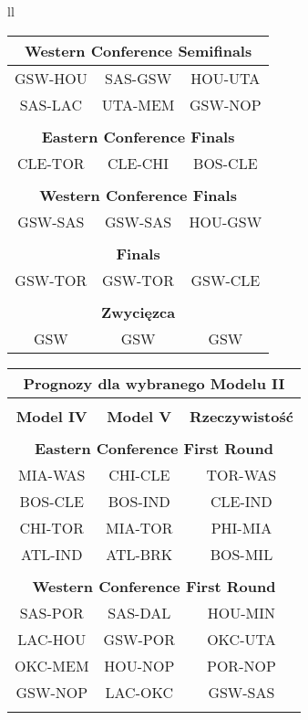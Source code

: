 \documentclass[inzynierska]{pwr_wmat_praca_dyplomowa}
\theoremstyle{plain}
\numberwithin{theorem}{chapter}
\theoremstyle{definition}
\numberwithin{theorem}{chapter}
\begin{document}
\begin{table}[]
\begin{tabular}{ll}
\begin{tabular}{|c|c|c|}
	\multicolumn{3}{|c|}{\textbf{Western Conference Semifinals}} \\\hline
	GSW-HOU&SAS-GSW &HOU-UTA\\\hline
	SAS-LAC&UTA-MEM &GSW-NOP\\\hline
	\multicolumn{3}{|c|}{} \\\hline
	
	\multicolumn{3}{|c|}{\textbf{Eastern Conference Finals}} \\\hline
	CLE-TOR&CLE-CHI &BOS-CLE\\\hline
	\multicolumn{3}{|c|}{} \\\hline
	
	\multicolumn{3}{|c|}{\textbf{Western Conference Finals}} \\\hline
	GSW-SAS&GSW-SAS &HOU-GSW\\\hline
	\multicolumn{3}{|c|}{} \\\hline
	
	\multicolumn{3}{|c|}{\textbf{Finals}} \\\hline
	GSW-TOR& GSW-TOR &GSW-CLE\\\hline
	\multicolumn{3}{|c|}{} \\\hline
	
	\multicolumn{3}{|c|}{\textbf{Zwycięzca}} \\\hline
	GSW&  GSW&GSW\\\hline
	\end{tabular}

	\begin{tabular}{ |c|c|c|  }
		\hline
		\multicolumn{3}{|c|}{\textbf{Prognozy dla wybranego Modelu II}} \\\hline
		\multicolumn{3}{|c|}{} \\\hline	
		\textbf{Model IV}& \textbf{Model V} &\textbf{Rzeczywistość}\\\hline	
		
		\multicolumn{3}{|c|}{} \\\hline	
		\multicolumn{3}{|c|}{\textbf{Eastern Conference First Round}} \\\hline
		MIA-WAS& CHI-CLE &TOR-WAS\\\hline
		BOS-CLE&BOS-IND &CLE-IND\\\hline
		CHI-TOR&MIA-TOR &PHI-MIA\\\hline
		ATL-IND&ATL-BRK &BOS-MIL\\\hline
		\multicolumn{3}{|c|}{} \\\hline
		
		\multicolumn{3}{|c|}{\textbf{Western Conference First Round}} \\\hline
		SAS-POR&SAS-DAL &HOU-MIN\\\hline
		LAC-HOU&GSW-POR &OKC-UTA\\\hline
		OKC-MEM& HOU-NOP&POR-NOP\\\hline
		GSW-NOP& LAC-OKC&GSW-SAS\\\hline
		\multicolumn{3}{|c|}{} \\\hline
		

\end{tabular}
\end{tabular}
\end{table}
\end{document}
